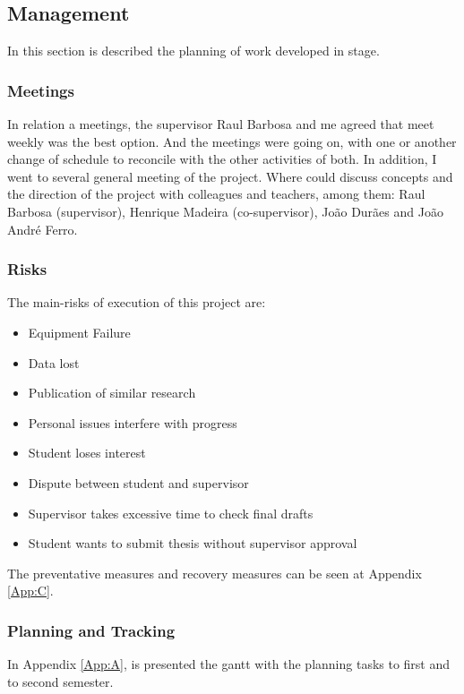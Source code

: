 \newpage
\subsection{Management}

In this section is described the planning of work developed in stage.

\subsubsection{Meetings}
In relation a meetings, the supervisor Raul Barbosa and me agreed that meet weekly was the best option. And the meetings were going on, with one or another change of schedule to reconcile with the other activities of both. In addition, I went to several general meeting of the project. Where could discuss concepts and the direction of the project with colleagues and teachers, among them: Raul Barbosa (supervisor), Henrique Madeira (co-supervisor), João Durães and João André Ferro.

\subsubsection{Risks}

The main-risks of execution of this project are:

\begin{itemize}
	\item Equipment Failure
	\item Data lost
	\item Publication of similar research
	\item Personal issues interfere with progress
	\item Student loses interest
	\item Dispute between student and supervisor
	\item Supervisor takes excessive time to check final drafts
	\item Student wants to submit thesis without supervisor approval
\end{itemize}


The preventative measures and recovery measures can be seen at Appendix \ref{App:C}.

\subsubsection{Planning and Tracking}
In Appendix \ref{App:A}, is presented the gantt with the planning tasks to first and to second semester.

